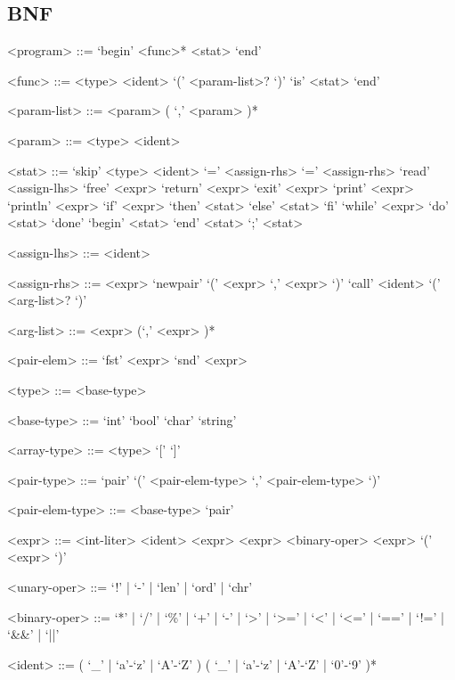 \documentclass[a4paper]{article}
\theoremstyle{definition}
\begin{document}
\subsection{BNF}
\begin{grammar}
  <program> ::= `begin' <func>* <stat> `end'

  <func> ::= <type> <ident> `(' <param-list>? `)' `is' <stat> `end'

  <param-list> ::= <param> ( `,' <param> )*

  <param> ::= <type> <ident>

  <stat>  ::= `skip'
    \alt <type> <ident> `=' <assign-rhs>
     `=' <assign-rhs>
    \alt `read' <assign-lhs>
    \alt `free' <expr>
    \alt `return' <expr>
    \alt `exit' <expr>
    \alt `print' <expr>
    \alt `println' <expr>
    \alt `if' <expr> `then' <stat> `else' <stat> `fi'
    \alt `while' <expr> `do' <stat> `done'
    \alt `begin' <stat> `end'
    \alt <stat> `;' <stat>

  <assign-lhs> ::= <ident>

  <assign-rhs> ::= <expr>
    \alt `newpair' `(' <expr> `,' <expr> `)'
    \alt `call' <ident> `(' <arg-list>? `)'

  <arg-list> ::= <expr> (`,' <expr> )*

  <pair-elem> ::= `fst' <expr>
    \alt `snd' <expr>

  <type> ::= <base-type>

  <base-type> ::= `int'
    \alt `bool'
    \alt `char'
    \alt `string'

  <array-type> ::= <type> `[' `]'

  <pair-type> ::= `pair' `(' <pair-elem-type> `,' <pair-elem-type> `)'

  <pair-elem-type> ::= <base-type>
    \alt `pair'

  <expr> ::= <int-liter>
    \alt <ident>
     <expr>
    \alt <expr> <binary-oper> <expr>
    \alt `(' <expr> `)'

  <unary-oper> ::= `!' | `-' | `len' | `ord' | `chr'

  <binary-oper> ::= `*' | `/' | `\%' | `+' | `-' | `>' | `>=' | `<' | `<=' | `==' | `!=' | `&&' | `||'

  <ident> ::= ( `\_' | `a'-`z' | `A'-`Z' ) ( `\_' | `a'-`z' | `A'-`Z' | `0'-`9' )*


\end{grammar}
\end{document}
